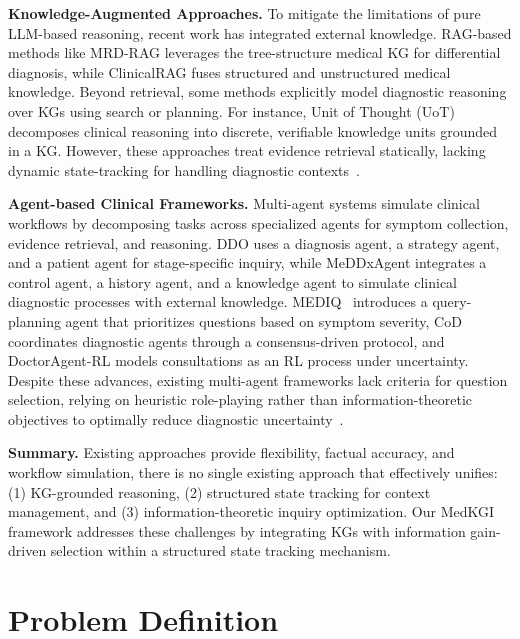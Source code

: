\documentclass[11pt]{article}
\newcommand{\tool}{MedKGI{\xspace}}
\begin{document}
\textbf{Knowledge-Augmented Approaches.} 
To mitigate the limitations of pure LLM-based reasoning, recent work has integrated external knowledge. 
RAG-based methods like MRD-RAG \cite{mrdrag2025sun} leverages the tree-structure medical KG for differential diagnosis, while ClinicalRAG \cite{clinicalrag2024lu} fuses structured and unstructured medical knowledge. 
Beyond retrieval, some methods explicitly model diagnostic reasoning over KGs using search or planning.
For instance, Unit of Thought (UoT)~\cite{uot2024hu} decomposes clinical reasoning into discrete, verifiable knowledge units grounded in a KG.
However, these approaches treat evidence retrieval statically, lacking dynamic state-tracking for handling diagnostic contexts~\cite{adaptive2025wang}.

\textbf{Agent-based Clinical Frameworks.}
Multi-agent systems simulate clinical workflows by decomposing tasks across specialized agents for symptom collection, evidence retrieval, and reasoning.
DDO \cite{ddo2025jia} uses a diagnosis agent, a strategy agent, and a patient agent for stage-specific inquiry, while MeDDxAgent \cite{meddxagent2025rose} integrates a control agent, a history agent, and a knowledge agent to simulate clinical diagnostic processes with external knowledge. 
MEDIQ~\cite{mediq2024li} introduces a query-planning agent that prioritizes questions based on symptom severity, CoD~\cite{cod2025chen} coordinates diagnostic agents through a consensus-driven protocol, and DoctorAgent-RL \cite{doctorrl2025feng} models consultations as an RL process under uncertainty. 
Despite these advances, existing multi-agent frameworks lack criteria for question selection, relying on heuristic role-playing rather than information-theoretic objectives to optimally reduce diagnostic uncertainty~\cite{agent2025chen}.



\textbf{Summary.}
Existing approaches provide flexibility, factual accuracy, and workflow simulation, there is no single existing approach that effectively unifies: (1) KG-grounded reasoning, (2) structured state tracking for context management, and (3) information-theoretic inquiry optimization. 
Our \tool{} framework addresses these challenges by integrating KGs with information gain-driven selection within a structured state tracking mechanism.

\section{Problem Definition}
\end{document}
